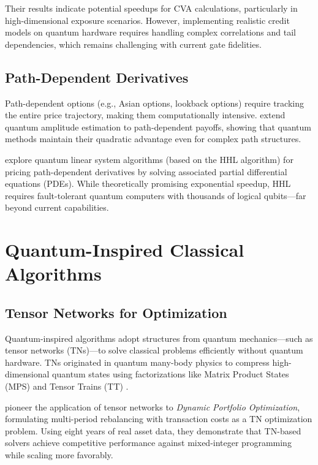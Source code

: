 \documentclass[12pt]{article}
\numberwithin{equation}{section}
\begin{document}
Their results indicate potential speedups for CVA calculations, particularly in high-dimensional exposure scenarios. However, implementing realistic credit models on quantum hardware requires handling complex correlations and tail dependencies, which remains challenging with current gate fidelities.

\subsection{Path-Dependent Derivatives}

Path-dependent options (e.g., Asian options, lookback options) require tracking the entire price trajectory, making them computationally intensive. \citet{Woerner2019QAEOptions} extend quantum amplitude estimation to path-dependent payoffs, showing that quantum methods maintain their quadratic advantage even for complex path structures.

\citet{An2021QuantumLinear} explore quantum linear system algorithms (based on the HHL algorithm) for pricing path-dependent derivatives by solving associated partial differential equations (PDEs). While theoretically promising exponential speedup, HHL requires fault-tolerant quantum computers with thousands of logical qubits—far beyond current capabilities.

\section{Quantum-Inspired Classical Algorithms}
\label{sec:qi_algorithms}

\subsection{Tensor Networks for Optimization}

Quantum-inspired algorithms adopt structures from quantum mechanics—such as tensor networks (TNs)—to solve classical problems efficiently without quantum hardware. TNs originated in quantum many-body physics to compress high-dimensional quantum states using factorizations like Matrix Product States (MPS) and Tensor Trains (TT) \citep{Orus2014TensorNetworks}.

\citet{Mugel2020DynamicPortfolio} pioneer the application of tensor networks to \textit{Dynamic Portfolio Optimization}, formulating multi-period rebalancing with transaction costs as a TN optimization problem. Using eight years of real asset data, they demonstrate that TN-based solvers achieve competitive performance against mixed-integer programming while scaling more favorably.
\end{document}
